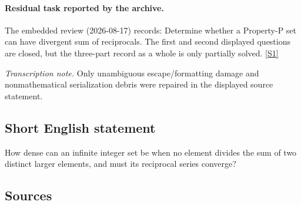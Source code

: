 \documentclass[11pt,a4paper]{article}
\newcommand{\sref}[2]{\hyperlink{source:#1:#2}{[S#2]}}
\begin{document}
\paragraph{Residual task reported by the archive.}

The embedded review (2026-08-17) records: Determine whether a Property-P set can have divergent sum of reciprocals. The first and second displayed questions are closed, but the three-part record as a whole is only partially solved. \sref{1883}{1}

{\small\emph{Transcription note.} Only unambiguous escape/formatting damage and nonmathematical serialization debris were repaired in the displayed source statement.}

\subsection{Short English statement}

How dense can an infinite integer set be when no element divides the sum of two distinct larger elements, and must its reciprocal series converge?

\subsection{Sources}
\end{document}
